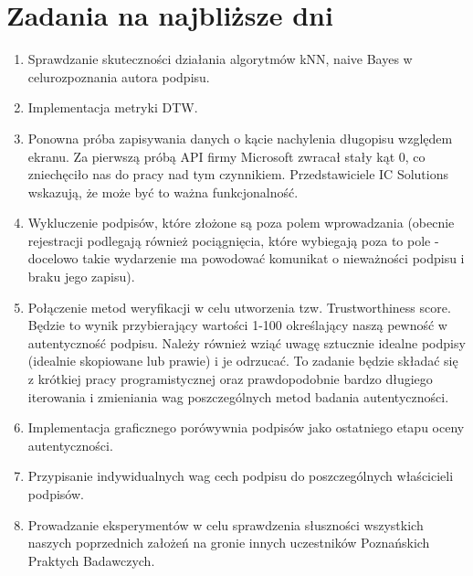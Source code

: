 \documentclass{mwrep}
\begin{document}
{\let\clearpage\relax \chapter{Zadania na najbliższe dni}}
\begin{enumerate}
	\item Sprawdzanie skuteczności działania algorytmów kNN, naive Bayes w celurozpoznania autora podpisu.
	\item Implementacja metryki DTW. 
    \item Ponowna próba zapisywania danych o kącie nachylenia długopisu względem ekranu. Za pierwszą próbą API firmy Microsoft zwracał stały kąt 0, co zniechęciło nas do pracy nad tym czynnikiem. Przedstawiciele IC Solutions wskazują, że może być to ważna funkcjonalność.
    \item Wykluczenie podpisów, które złożone są poza polem wprowadzania (obecnie rejestracji podlegają również pociągnięcia, które wybiegają poza to pole - docelowo takie wydarzenie ma powodować komunikat o nieważności podpisu i braku jego zapisu).
    \item Połączenie metod weryfikacji w celu utworzenia tzw. Trustworthiness score. Będzie to wynik przybierający wartości 1-100 określający naszą pewność w autentyczność podpisu. Należy również wziąć uwagę sztucznie idealne podpisy (idealnie skopiowane lub prawie) i je odrzucać.
    To zadanie będzie składać się z krótkiej pracy programistycznej oraz prawdopodobnie bardzo długiego iterowania i zmieniania wag poszczególnych metod badania autentyczności.
    \item Implementacja graficznego porówywnia podpisów jako ostatniego etapu oceny autentyczności.
    \item Przypisanie indywidualnych wag cech podpisu do poszczególnych właścicieli podpisów.   
    \item Prowadzanie eksperymentów w celu sprawdzenia słuszności wszystkich naszych poprzednich założeń na gronie innych uczestników Poznańskich Praktych Badawczych.
    
\end{enumerate}
\end{document}
